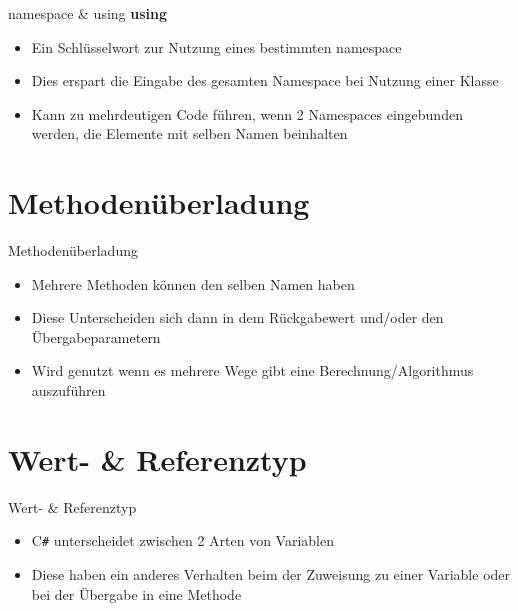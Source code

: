 \begin{frame}{namespace \& using}
	\textbf{using}\\
	\begin{itemize}
		\item Ein Schlüsselwort zur Nutzung eines bestimmten \alert{namespace}
		\item Dies erspart die Eingabe des gesamten Namespace bei Nutzung einer Klasse
		\item Kann zu mehrdeutigen Code führen, wenn 2 Namespaces eingebunden werden, die Elemente mit selben Namen beinhalten
	\end{itemize}
	
\end{frame}

\section{Methodenüberladung}
\begin{frame}{Methodenüberladung}
	\begin{itemize}
		\item Mehrere Methoden können den selben Namen haben
		\item Diese Unterscheiden sich dann in dem Rückgabewert und/oder den Übergabeparametern
		\item Wird genutzt wenn es mehrere Wege gibt eine Berechnung/Algorithmus auszuführen
	\end{itemize}
	
\end{frame}

\section{Wert- \& Referenztyp}
\begin{frame}{Wert- \& Referenztyp}
	\begin{itemize}
		\item C\texttt{\#} unterscheidet zwischen 2 Arten von Variablen
		\item Diese haben ein anderes Verhalten beim der Zuweisung zu einer Variable oder bei der Übergabe in eine Methode
	\end{itemize}
\end{frame}

